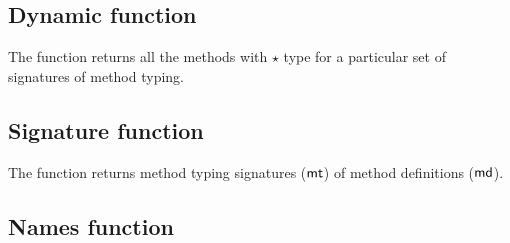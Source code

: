 \documentclass[runnningheads]{tex/llncs}
\begin{document}
\begin{mathpar}




\end{mathpar}

\subsection{Dynamic function}

The  function returns all the methods with $\star$ type for a particular set of 
signatures of method typing.

\begin{mathpar}

\end{mathpar}

\subsection{Signature function}

The  function returns method typing signatures ($\mt$) of method definitions ($\md$).

\begin{mathpar}

\end{mathpar}

\subsection{Names function}
\end{document}

